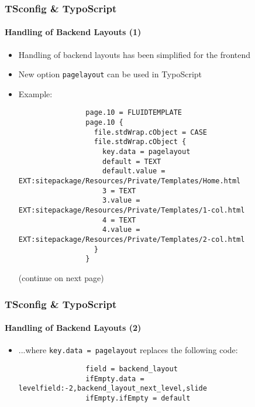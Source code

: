 \begin{frame}[fragile]
	\frametitle{TSconfig \& TypoScript}
	\framesubtitle{Handling of Backend Layouts (1)}

	\lstset{basicstyle=\tiny\ttfamily}

	\begin{itemize}

		\item Handling of backend layouts has been simplified for the frontend

		\item New option \texttt{pagelayout} can be used in TypoScript

		\item Example:

			\begin{lstlisting}
				page.10 = FLUIDTEMPLATE
				page.10 {
				  file.stdWrap.cObject = CASE
				  file.stdWrap.cObject {
				    key.data = pagelayout
				    default = TEXT
				    default.value = EXT:sitepackage/Resources/Private/Templates/Home.html
				    3 = TEXT
				    3.value = EXT:sitepackage/Resources/Private/Templates/1-col.html
				    4 = TEXT
				    4.value = EXT:sitepackage/Resources/Private/Templates/2-col.html
				  }
				}
			\end{lstlisting}

			\smaller
				(continue on next page)
			\normalsize

	\end{itemize}

\end{frame}


\begin{frame}[fragile]
	\frametitle{TSconfig \& TypoScript}
	\framesubtitle{Handling of Backend Layouts (2)}

	\lstset{basicstyle=\tiny\ttfamily}

	\begin{itemize}

		\item ...where \texttt{key.data = pagelayout} replaces the following code:

			\begin{lstlisting}
				field = backend_layout
				ifEmpty.data = levelfield:-2,backend_layout_next_level,slide
				ifEmpty.ifEmpty = default
			\end{lstlisting}

	\end{itemize}

\end{frame}

